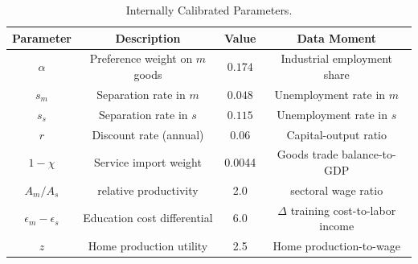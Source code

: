\documentclass[12pt]{article} %
\theoremstyle{definition}
\begin{document}
\begin{table}[h!]
\centering
\caption{Internally Calibrated Parameters.}\label{table_calibrated_parameters}
\begin{tabular}{||c c c c||}\hline
\textbf{Parameter} & \textbf{Description} & \textbf{Value} & Data Moment \\\hline\hline
$\alpha$ & Preference weight on $m$ goods & $0.174$ & Industrial employment share \\
$s_m$ & Separation rate in $m$ & $0.048$ & Unemployment rate in $m$  \\
$s_s$ & Separation rate in $s$ & $0.115$ & Unemployment rate in $s$ \\
$r$ & Discount rate (annual) & $0.06$ & Capital-output ratio \\
$1-\chi$ & Service import weight & 0.0044 & Goods trade balance-to-GDP \\
$A_m/A_s$   & relative productivity & 2.0  &   sectoral wage ratio\\
$\epsilon_m-\epsilon_s$ & Education cost differential & 6.0 &  $\Delta$ training cost-to-labor income \\ 
$z$  & Home production utility  & 2.5 & Home production-to-wage
\\\hline
\end{tabular}
\end{table}

\noindent
\end{document}
